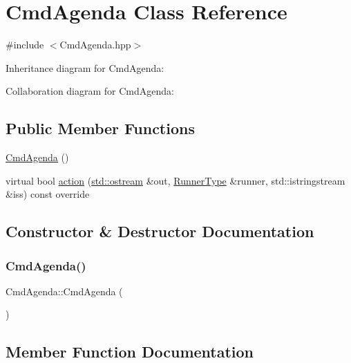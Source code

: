 \hypertarget{classCmdAgenda}{}\section{Cmd\+Agenda Class Reference}
\label{classCmdAgenda}


{\ttfamily \#include $<$Cmd\+Agenda.\+hpp$>$}



Inheritance diagram for Cmd\+Agenda\+:


Collaboration diagram for Cmd\+Agenda\+:
\subsection*{Public Member Functions}
\begin{DoxyCompactItemize}
\item 
\hyperlink{classCmdAgenda_a5433bd5e949c77b69ed255e0baa86c6f}{Cmd\+Agenda} ()
\item 
virtual bool \hyperlink{classCmdAgenda_ab723208cb36623b3d4583e1fae6f22be}{action} (\hyperlink{doctest_8h_a116af65cb5e924b33ad9d9ecd7a783f3}{std\+::ostream} \&out, \hyperlink{Command_8hpp_ad45c3de597c2023a8be0399d914161f4}{Runner\+Type} \&runner, std\+::istringstream \&iss) const override
\end{DoxyCompactItemize}


\subsection{Constructor \& Destructor Documentation}
\mbox{\label{classCmdAgenda_a5433bd5e949c77b69ed255e0baa86c6f}} 
\subsubsection{\texorpdfstring{Cmd\+Agenda()}{CmdAgenda()}}
{\footnotesize\ttfamily Cmd\+Agenda\+::\+Cmd\+Agenda (\begin{DoxyParamCaption}{ }\end{DoxyParamCaption})}



\subsection{Member Function Documentation}
\mbox{\label{classCmdAgenda_ab723208cb36623b3d4583e1fae6f22be}} 
